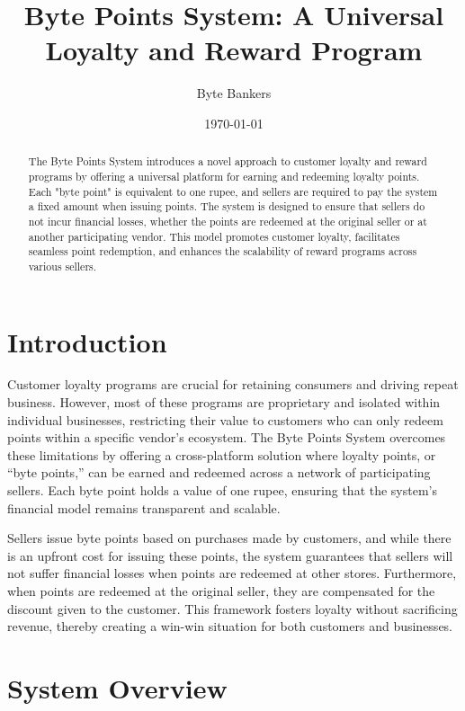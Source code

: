 \documentclass[a4paper,12pt]{article}
\title{Byte Points System: A Universal Loyalty and Reward Program}
\author{Byte Bankers}
\date{\today}
\begin{document}
\maketitle

\begin{abstract}
The Byte Points System introduces a novel approach to customer loyalty and reward programs by offering a universal platform for earning and redeeming loyalty points. Each "byte point" is equivalent to one rupee, and sellers are required to pay the system a fixed amount when issuing points. The system is designed to ensure that sellers do not incur financial losses, whether the points are redeemed at the original seller or at another participating vendor. This model promotes customer loyalty, facilitates seamless point redemption, and enhances the scalability of reward programs across various sellers.
\end{abstract}

\section{Introduction}

Customer loyalty programs are crucial for retaining consumers and driving repeat business. However, most of these programs are proprietary and isolated within individual businesses, restricting their value to customers who can only redeem points within a specific vendor’s ecosystem. The Byte Points System overcomes these limitations by offering a cross-platform solution where loyalty points, or “byte points,” can be earned and redeemed across a network of participating sellers. Each byte point holds a value of one rupee, ensuring that the system’s financial model remains transparent and scalable.

Sellers issue byte points based on purchases made by customers, and while there is an upfront cost for issuing these points, the system guarantees that sellers will not suffer financial losses when points are redeemed at other stores. Furthermore, when points are redeemed at the original seller, they are compensated for the discount given to the customer. This framework fosters loyalty without sacrificing revenue, thereby creating a win-win situation for both customers and businesses.

\section{System Overview}
\end{document}
